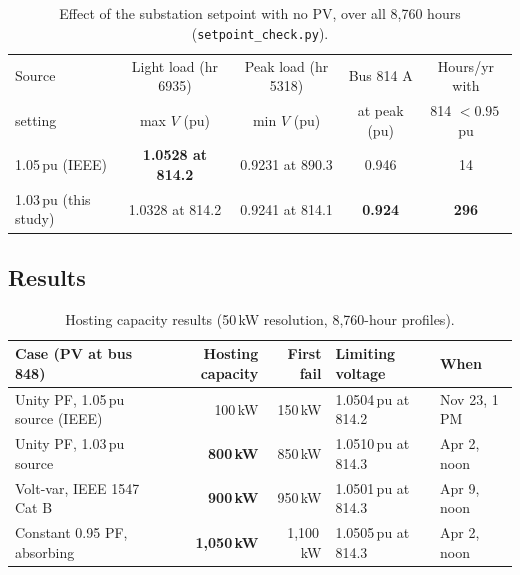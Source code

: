 \documentclass[11pt,letterpaper]{article}
\begin{document}
\begin{table}[H]
\centering
\small
\begin{tabular}{@{}lcccc@{}}
\toprule
Source & Light load (hr 6935) & Peak load (hr 5318) & Bus 814 A & Hours/yr with \\
setting & max $V$ (pu) & min $V$ (pu) & at peak (pu) & 814 $<0.95$\,pu \\
\midrule
1.05\,pu (IEEE) & \textbf{1.0528 at 814.2} & 0.9231 at 890.3 & 0.946 & 14 \\
1.03\,pu (this study) & 1.0328 at 814.2 & 0.9241 at 814.1 & \textbf{0.924} & \textbf{296} \\
\bottomrule
\end{tabular}
\caption{Effect of the substation setpoint with no PV, over all 8{,}760 hours (\texttt{setpoint\_check.py}).}
\label{tab:source}
\end{table}

\subsection{Results}
\begin{table}[H]
\centering
\small
\begin{tabular}{@{}lrrll@{}}
\toprule
Case (PV at bus 848) & Hosting capacity & First fail & Limiting voltage & When \\
\midrule
Unity PF, 1.05\,pu source (IEEE) & 100\,kW & 150\,kW & 1.0504\,pu at 814.2 & Nov 23, 1\,PM \\
Unity PF, 1.03\,pu source & \textbf{800\,kW} & 850\,kW & 1.0510\,pu at 814.3 & Apr 2, noon \\
Volt-var, IEEE 1547 Cat B & \textbf{900\,kW} & 950\,kW & 1.0501\,pu at 814.3 & Apr 9, noon \\
Constant 0.95 PF, absorbing & \textbf{1{,}050\,kW} & 1{,}100\,kW & 1.0505\,pu at 814.3 & Apr 2, noon \\
\bottomrule
\end{tabular}
\caption{Hosting capacity results (50\,kW resolution, 8{,}760-hour profiles).}
\label{tab:hc}
\end{table}
\end{document}
